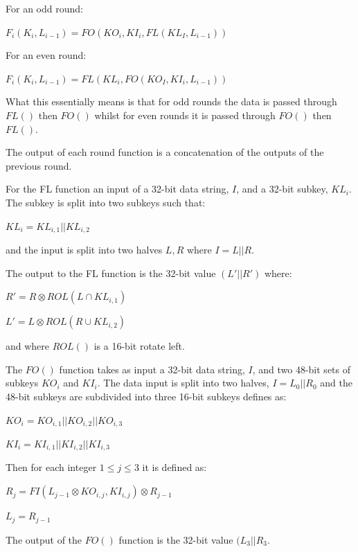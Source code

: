 \documentclass[10pt,journal,compsoc]{IEEEtran}
\begin{document}
For an odd round:
\begin{center}
    \(F_i(K_i, L_{i-1}) = FO(KO_i, KI_i, FL(KL_I, L_{i-1}))\)
\end{center}

For an even round:
\begin{center}
    \(F_i(K_i, L_{i-1}) = FL(KL_i, FO(KO_I, KI_i, L_{i-1}))\)
\end{center}
What this essentially means is that for odd rounds the data is passed through \(FL()\) then \(FO()\) whilst for even rounds it is passed through \(FO()\) then \(FL()\).

The output of each round function is a concatenation of the outputs of the previous round.

For the FL function an input of a 32-bit data string, \(I\), and a 32-bit subkey, \(KL_i\). The subkey is split into two subkeys such that:

\begin{center}
    \(KL_i = KL_{i,1} || KL_{i,2}\)
\end{center}
and the input is split into two halves \(L, R\) where \(I = L || R\). 

The output to the FL function is the 32-bit value \((L'||R')\) where:

\begin{center}
    \(R' = R \otimes ROL(L \cap KL_{i,1})\)

    \(L' = L \otimes ROL(R \cup KL_{i,2})\)
\end{center}
and where \(ROL()\) is a 16-bit rotate left.

The \(FO()\) function takes as input a 32-bit data string, \(I\), and two 48-bit sets of subkeys \(KO_i\) and \(KI_i\). The data input is split into two halves, \(I = L_0||R_0\) and the 48-bit subkeys are subdivided into three 16-bit subkeys defines as:
\begin{center}
    \(KO_i = KO_{i,1}||KO_{i,2}||KO_{i,3}\)

    \(KI_i = KI_{i,1}||KI_{i,2}||KI_{i,3}\)
\end{center}

Then for each integer \(1 \leq j \leq 3\) it is defined as:
\begin{center}
    \(R_j = FI(L_{j-1} \otimes KO_{i,j}, KI_{i,j}) \otimes R_{j-1}\)

    \(L_j = R_{j-1} \)
\end{center}

The output of the \(FO()\) function is the 32-bit value \((L_3||R_3\).
\end{document}
